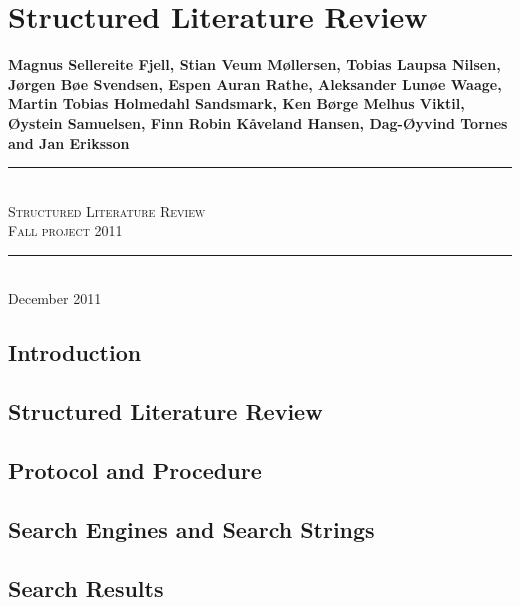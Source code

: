 \chapter{Structured Literature Review}
\label{appendix:slrreport}

\newcommand{\slrTitle}{Structured Literature Review}
\newcommand{\slrSubtitle}{Fall project 2011}
\newcommand{\slrMadeby}{Magnus Sellereite Fjell, Stian Veum M{\o}llersen, Tobias Laupsa Nilsen, J{\o}rgen B{\o}e Svendsen, Espen Auran Rathe, Aleksander Lun{\o}e Waage, Martin Tobias Holmedahl Sandsmark, Ken B{\o}rge Melhus Viktil, {\O}ystein Samuelsen, Finn Robin K{\aa}veland Hansen, Dag-{\O}yvind Tornes and Jan Eriksson}
\newcommand{\slrDate}{December 2011}
\newcommand{\Hline}{\rule{\linewidth}{0.3mm} \\}

\begin{center}
\large \textbf{\slrMadeby}

\vspace{3cm}
\Hline
\Huge \textsc{\slrTitle}
\vspace{2cm}
\huge \\ \textsc{\slrSubtitle}
\Hline
\vfill
\normalsize \slrDate
\end{center}

\section{Introduction}


\section{Structured Literature Review}


\section{Protocol and Procedure}


\section{Search Engines and Search Strings}


\section{Search Results}


\clearpage
